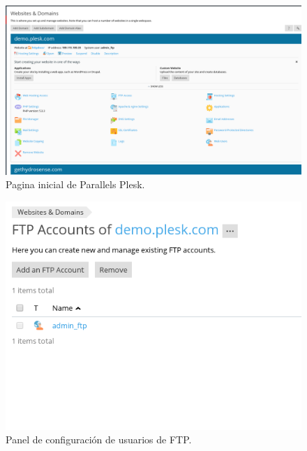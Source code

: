 \begin{figure}[H]
    \begin{center}
        \advance\leftskip-2.2cm
        \includegraphics[scale=0.35]{imagenes/img56}
        \caption{Pagina inicial de Parallels Plesk.}
        \label{fig51}
    \end{center}
\end{figure}

\begin{figure}[H]
    \begin{center}
        \includegraphics[scale=0.5]{imagenes/img57}
        \caption{Panel de configuración de usuarios de FTP.}
        \label{fig52}
    \end{center}
\end{figure}

